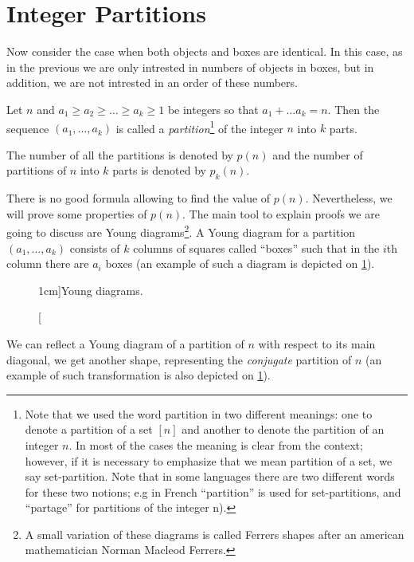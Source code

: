 \section{Integer Partitions}
Now consider the case when both objects and boxes are identical. In this case,
as in the previous we are only intrested in numbers of objects in boxes, but
in addition, we are not intrested in an order of these numbers.

\begin{definition}
  Let $n$ and $a_1 \ge a_2 \ge \dots \ge a_k \ge 1$ be integers so that
  $a_1 + \dots a_k = n$. Then the sequence $(a_1, \dots, a_k)$ is called
  a \emph{partition}\footnote[][-3cm]{%
    Note that we used the word partition in two different meanings: one to
    denote a partition of a set $[n]$ and another to denote the partition of
    an integer $n$. In most of the cases the meaning is clear from the context;
    however, if it is necessary to emphasize that we mean partition of a set,
    we say set-partition. Note that in some languages there are two different
    words for these two notions; e.g in French ``partition'' is used for
    set-partitions, and ``partage'' for partitions of the integer n).
  } of the integer $n$ into $k$ parts.

  The number of all the partitions is denoted by $p(n)$ and the number of
  partitions of $n$ into $k$ parts is denoted by $p_k(n)$.
\end{definition}



There is no good formula allowing to find the value of $p(n)$. Nevertheless, we will
prove some properties of $p(n)$. The main tool to explain proofs we are going to
discuss are Young diagrams\footnote{%
  A small variation of these diagrams is called Ferrers shapes after an
  american mathematician Norman Macleod Ferrers.
}.
A Young diagram for a partition $(a_1, \dots, a_k)$ consists of $k$ columns of
squares called ``boxes'' such that in the $i$th column there are $a_i$ boxes
(an example of such a diagram is depicted on \ref{figure:young-diagram-example}).
\begin{figure}
  \centering
  \qquad\qquad
  \caption[][1cm]{Young diagrams.}
  \label{figure:young-diagram-example}
\end{figure}
We can reflect a Young diagram of a partition of $n$ with respect to its main
diagonal, we get another shape, representing the \emph{conjugate} partition of
$n$ (an example of such transformation is also depicted on
\ref{figure:young-diagram-example}).

